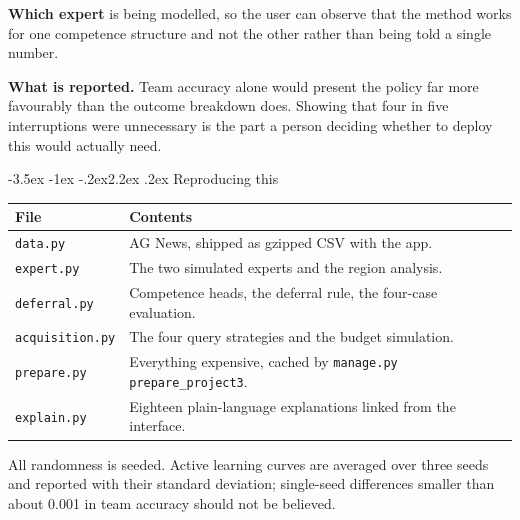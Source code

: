 \documentclass[11pt,a4paper]{article}
\makeatletter
\renewcommand\section{\@startsection{section}{1}{\z@}%
  {-3.5ex \@plus -1ex \@minus -.2ex}{2.2ex \@plus.2ex}%
  {\normalfont\Large\sffamily\bfseries\color{accent}}}
\newcommand{\file}[1]{\texttt{\small #1}}
\makeatother
\begin{document}
\textbf{Which expert} is being modelled, so the user can observe that the method
works for one competence structure and not the other rather than being told a
single number.

\textbf{What is reported.} Team accuracy alone would present the policy far more
favourably than the outcome breakdown does. Showing that four in five
interruptions were unnecessary is the part a person deciding whether to deploy
this would actually need.

\section{Reproducing this}

\begin{center}
\small
\begin{tabularx}{0.94\textwidth}{@{}lX@{}}
\toprule
\textbf{File} & \textbf{Contents} \\
\midrule
\file{data.py}          & AG News, shipped as gzipped CSV with the app. \\
\file{expert.py}        & The two simulated experts and the region analysis. \\
\file{deferral.py}      & Competence heads, the deferral rule, the four-case evaluation. \\
\file{acquisition.py}   & The four query strategies and the budget simulation. \\
\file{prepare.py}       & Everything expensive, cached by \file{manage.py prepare\_project3}. \\
\file{explain.py}       & Eighteen plain-language explanations linked from the interface. \\
\bottomrule
\end{tabularx}
\end{center}

All randomness is seeded. Active learning curves are averaged over three seeds
and reported with their standard deviation; single-seed differences smaller than
about 0.001 in team accuracy should not be believed.
\end{document}
